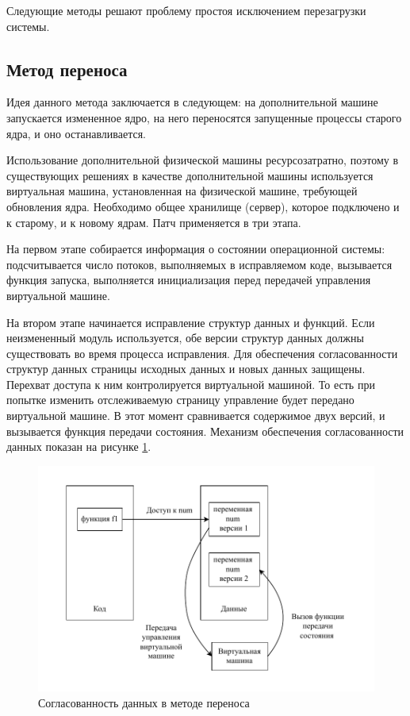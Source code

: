 Следующие методы решают проблему простоя исключением перезагрузки системы.

\subsection{Метод переноса}

Идея данного метода \cite{autopod} заключается в следующем: на дополнительной машине запускается измененное ядро, на него переносятся запущенные процессы старого ядра, и оно останавливается.

Использование дополнительной физической машины ресурсозатратно, поэтому в существующих решениях \cite{lucos} в качестве дополнительной машины используется виртуальная машина, установленная на физической машине, требующей обновления ядра. Необходимо общее хранилище (сервер), которое подключено и к старому, и к новому ядрам. Патч применяется в три этапа.

На первом этапе собирается информация о состоянии операционной системы: подсчитывается число потоков, выполняемых в исправляемом коде, вызывается функция запуска, выполняется инициализация перед передачей управления виртуальной машине.

На втором этапе начинается исправление структур данных и функций. Если неизмененный модуль используется, обе версии структур данных должны существовать во время процесса исправления. Для обеспечения согласованности структур данных страницы исходных данных и новых данных защищены. Перехват доступа к ним контролируется виртуальной машиной. То есть при попытке изменить отслеживаемую страницу управление будет передано виртуальной машине. В этот момент сравнивается содержимое двух версий, и вызывается функция передачи состояния. Механизм обеспечения согласованности данных показан на рисунке \ref{img:vm}.

\begin{figure}[H]
	\begin{center}
		\includegraphics[scale=0.8]{img/vm.pdf}
	\end{center}
	\captionsetup{justification=centering}
	\caption{Согласованность данных в методе переноса}
	\label{img:vm}
\end{figure}

